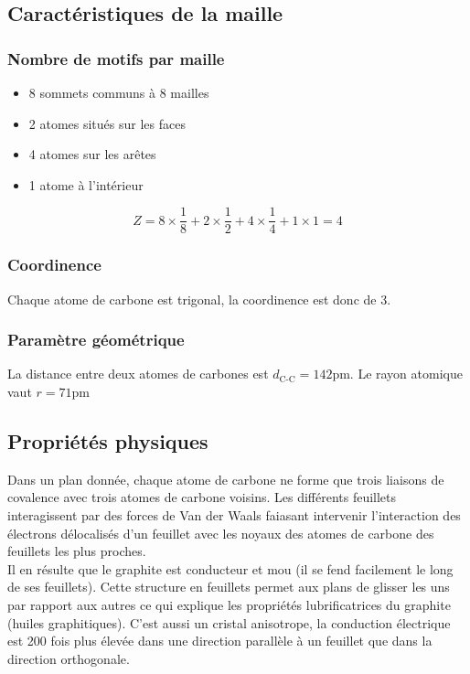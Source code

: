 \subsection{Caractéristiques de la maille}
\subsubsection{Nombre de motifs par maille}

\begin{itemize}
    \item 8 sommets communs à 8 mailles
    \item 2 atomes situés sur les faces
    \item 4 atomes sur les arêtes
    \item 1 atome à l'intérieur
\end{itemize}
\begin{equation}
    Z = 8 \times \frac{1}{8} + 2 \times \frac{1}{2} + 4 \times
    \frac{1}{4} + 1 \times 1 = 4
\end{equation}
\subsubsection{Coordinence}
Chaque atome de carbone est trigonal, la coordinence
est donc de 3.
\subsubsection{Paramètre géométrique}
La distance entre deux atomes de carbones est $d_\text{C-C} = 142$pm.
Le rayon atomique vaut $r = 71$pm

\subsection{Propriétés physiques}
Dans un plan donnée, chaque atome de carbone ne forme que trois
liaisons de covalence avec trois atomes de carbone voisins.
Les différents feuillets interagissent par des forces de Van der
Waals faiasant intervenir l'interaction des électrons délocalisés
d'un feuillet avec les noyaux des atomes de carbone des feuillets
les plus proches.\\
Il en résulte que le graphite est
conducteur et mou (il se fend facilement le long de ses feuillets).
Cette structure en feuillets permet aux plans de glisser les uns
par rapport aux autres ce qui explique les propriétés lubrificatrices
du graphite (huiles graphitiques). C'est aussi un cristal anisotrope,
la conduction électrique est 200 fois plus élevée dans une direction
parallèle à un feuillet que dans la direction orthogonale.


